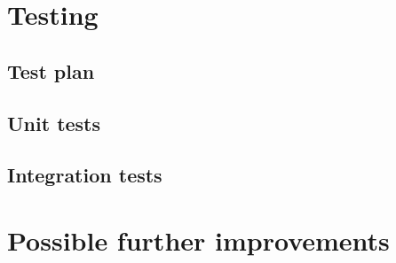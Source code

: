 \section{Testing}

\subsection{Test plan}

\subsection{Unit tests}

\subsection{Integration tests}

\section{Possible further improvements}


